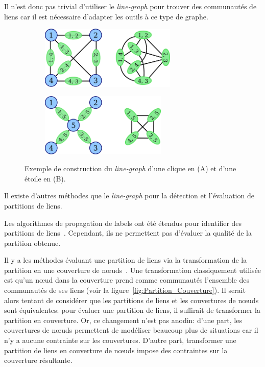 Il n'est donc pas trivial d'utiliser le \emph{line-graph} pour trouver des communautés de liens car il est nécessaire d'adapter les outils à ce type de graphe.
\begin{figure}
\centering

	\begin{subfigure}{0.4\textwidth}
		\includegraphics[height=3cm]{img/ExpectedNodes/Example/transfo_clique}
		\caption{}
		\label{fig:ex_lineG_clique}	
	\end{subfigure}\hspace*{0.1\textwidth}
	\begin{subfigure}{0.4\textwidth}
		\includegraphics[height=3cm]{img/ExpectedNodes/Example/transfo_etoile}
		\caption{}
		\label{fig:ex_lineG_etoile}	
	\end{subfigure}
	

	\caption{Exemple de construction du \emph{line-graph} d'une clique en (A) et d'une étoile en (B).}
	\label{fig:fail_construction_lineG}
\end{figure}




Il existe d'autres méthodes que le \emph{line-graph} pour la détection et l'évaluation de partitions de liens.

Les algorithmes de propagation de labels ont été étendus pour identifier des partitions de liens~\cite{Yu2013}.
Cependant, ils ne permettent pas d'évaluer la qualité de la partition obtenue.

Il y a les méthodes évaluant une partition de liens via la transformation de la partition en une couverture de n\oe{}uds~\cite{Huang2013,Lim2014,Wu2010a}.
Une transformation classiquement utilisée est qu'un n\oe{}ud dans la couverture prend comme communautés l'ensemble des communautés de ses liens (voir la figure~\ref{fig:Partition_Couverture}).
Il serait alors tentant de considérer que les partitions de liens et les couvertures de n\oe{}uds sont équivalentes: pour évaluer une partition de liens, il suffirait de transformer la partition en couverture.
Or, ce changement n'est pas anodin:
d'une part, les couvertures de n\oe{}uds permettent de modéliser beaucoup plus de situations car il n'y a aucune contrainte sur les couvertures.
D'autre part, transformer une partition de liens en couverture de n\oe{}uds impose des contraintes sur la couverture résultante.

